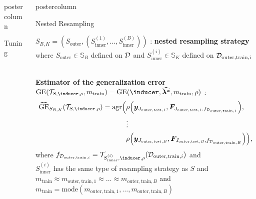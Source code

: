 \documentclass{beamer}
\newlength{\columnheight} %
\begin{document}
\begin{frame}[fragile]{}
\begin{columns}
\begin{column}{.31\textwidth}
\begin{beamercolorbox}[center]{postercolumn}
\begin{minipage}{.98\textwidth}
{\begin{myblock}{Tuning}
\end{myblock}



				}
			\end{minipage}
		\end{beamercolorbox}
	\end{column}
	\begin{column}{.31\textwidth}
		\begin{beamercolorbox}[center]{postercolumn}
			\begin{minipage}{.98\textwidth}
				\parbox[t][\columnheight]{\textwidth}{


\begin{myblock}{Nested Resampling}

$S_{B, K} = \left(S_{\mathrm{outer}}, \left(S_{\mathrm{inner}}^{(1)},\dots,S_{\mathrm{inner}}^{(B)}
\right)\right)$ : \textbf{nested resampling strategy} where $S_{\mathrm{outer}} \in \mathds{S}_B$ defined on $\mathcal{D}$ and $S_{\mathrm{inner}}^{(i)} \in \mathds{S}_K$ defined on $\mathcal{D}_{\textrm{outer,train,i}}$\\\

\textbf{Estimator of the generalization error} $\mathrm{GE}(\mathcal{T}_{S,\inducer,\rho}, m_\mathrm{train}) = \mathrm{GE}(\inducer, \boldsymbol{\widehat{\lambda^*}}, m_\mathrm{train}, \rho)$ :
\begin{equation*}
\begin{split}
\widehat{\mathrm{GE}}_{S_{B,K}}(\mathcal{T}_{S,\inducer,\rho}) = \mathrm{agr}\Big(
 &\rho\Big(\boldsymbol{y}_{J_{\mathrm{outer,test},1}}, \boldsymbol{F}_{J_{\mathrm{outer,test},1},f_{\mathcal{D}_{\mathrm{outer,train},1}}}\Big), \\ &\large{\vdots} \\
& \rho\Big(\boldsymbol{y}_{J_{\mathrm{outer,test},B}}, \boldsymbol{F}_{J_{\mathrm{outer,test},B},
f_{\mathcal{D}_{\mathrm{outer,train},B}}}\Big)
    \Big),
\end{split}
\end{equation*}
where $f_{\mathcal{D}_{\mathrm{outer,train},i}} = \mathcal{T}_{S_{\mathrm{inner}}^{(i)},\inducer,\rho}(\mathcal{D}_{\mathrm{outer,train},i})$ and \\
$S_{\mathrm{inner}}^{(i)}$ has the same type of resampling strategy as $S$ and \\
$m_{\mathrm{train}} \approx m_{\mathrm{outer,train},1} \approx \dots \approx m_{\mathrm{outer,train},B}$ and\\ $m_{\mathrm{train}} = \mathrm{mode}(m_{\mathrm{outer,train},1}, \dots, m_{\mathrm{outer,train},B})$\\


\end{myblock}}
\end{minipage}
\end{beamercolorbox}
\end{column}
\end{columns}
\end{frame}
\end{document}
